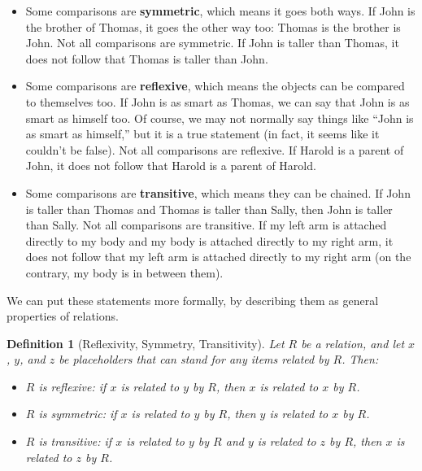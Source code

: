 \documentclass{book}
\numberwithin{equation}{chapter}
\newcommand{\vocab}{\textbf}
\newtheorem{definition}{Definition}
\begin{document}
\begin{itemize}

\item{Some comparisons are \vocab{symmetric}, which means it goes both ways. If John is the brother of Thomas, it goes the other way too: Thomas is the brother is John. Not all comparisons are symmetric. If John is taller than Thomas, it does not follow that Thomas is taller than John.}

\item{Some comparisons are \vocab{reflexive}, which means the objects can be compared to themselves too. If John is as smart as Thomas, we can say that John is as smart as himself too. Of course, we may not normally say things like ``John is as smart as himself,'' but it is a true statement (in fact, it seems like it couldn't be false). Not all comparisons are reflexive. If Harold is a parent of John, it does not follow that Harold is a parent of Harold.}

\item{Some comparisons are \vocab{transitive}, which means they can be chained. If John is taller than Thomas and Thomas is taller than Sally, then John is taller than Sally. Not all comparisons are transitive. If my left arm is attached directly to my body and my body is attached directly to my right arm, it does not follow that my left arm is attached directly to my right arm (on the contrary, my body is in between them).}

\end{itemize}

\noindent
We can put these statements more formally, by describing them as general properties of relations.

\begin{definition}[Reflexivity, Symmetry, Transitivity]
Let $R$ be a relation, and let $x$, $y$, and $z$ be placeholders that can stand for any items related by $R$. Then:

\begin{itemize}

\item{$R$ is reflexive: if $x$ is related to $y$ by $R$, then $x$ is related to $x$ by $R$.}

\item{$R$ is symmetric: if $x$ is related to $y$ by $R$, then $y$ is related to $x$ by $R$.}

\item{$R$ is transitive: if $x$ is related to $y$ by $R$ and $y$ is related to $z$ by $R$, then $x$ is related to $z$ by $R$.}

\end{itemize} 

\end{definition}
\end{document}
